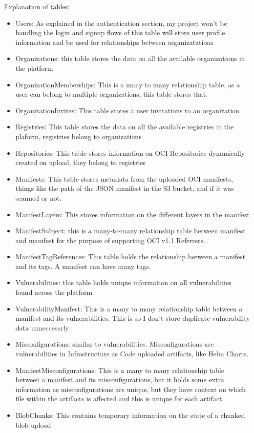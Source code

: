 \documentclass{article}
\begin{document}
  Explanation of tables:
  \begin{itemize}
    \item Users: As explained in the authentication section, my project won't be handling the login and signup flows of this table will store user profile information and be used for relationships between organizatations
    \item Organizations: this table stores the data on all the available organizations in the platform
    \item OrganizationMemberships: This is a many to many relationship table, as a user can belong to multiple organizations, this table stores that.
    \item OrganizationInvites: This table stores a user invitations to an organization 
    \item Registries: This table stores the data on all the available registries in the plaform, registries belong to organizations
    \item Repositories: This table stores information on OCI Repositories dynamically created on upload, they belong to registries
    \item Manifests: This table stores metadata from the uploaded OCI manifests, things like the path of the JSON manifest in the S3 bucket, and if it was scanned or not.
    \item ManifestLayers: This stores information on the different layers in the manifest
    \item ManifestSubject: this is a many-to-many relationship table between manifest and manifest for the purpose of supporting OCI v1.1 Referrers.
    \item ManifestTagReferences: This table holds the relationship between a manifest and its tags. A manifest can have many tags.
    \item Vulnerabilities: this table holds unique information on all vulnerabilities found across the platform
    \item VulnerabilityManifest: This is a many to many relationship table between a manifest and its vulnerabilities. This is so I don't store duplicate vulnerability data unneccesarly
    \item Misconfigurations: similar to vulnerabilities. Misconfigurations are vulnerabilities in Infrastructure as Code uploaded artifacts, like Helm Charts.
    \item ManifestMisconfigurations: This is a many to many relationship table between a manifest and its misconfigurations, but it holds some extra information as misconfigurations are unique, but they have context on which file within the artifacts is affected and this is unique for each artifact.
    \item BlobChunks: This contains temporary information on the state of a chunked blob upload
  \end{itemize}
\end{document}
